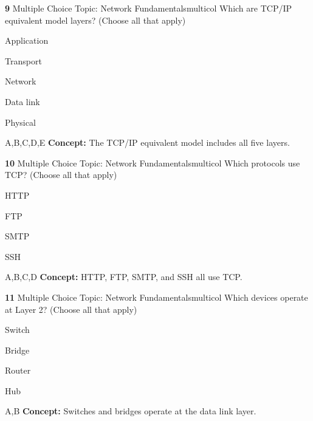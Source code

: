 \documentclass[10pt,a4paper]{article}
\begin{document}
\begin{qcard}{\color{white}\textbf{9} \hfill \small Multiple Choice \textbar{} Topic: Network Fundamentals}{multicol}
Which are TCP/IP equivalent model layers? (Choose all that apply)

\begin{qoptions}
\item Application
\item Transport
\item Network
\item Data link
\item Physical
\end{qoptions}
\begin{explainbox}{A,B,C,D,E}
\textbf{Concept:} The TCP/IP equivalent model includes all five layers.
\end{explainbox}
\end{qcard}

\begin{qcard}{\color{white}\textbf{10} \hfill \small Multiple Choice \textbar{} Topic: Network Fundamentals}{multicol}
Which protocols use TCP? (Choose all that apply)

\begin{qoptions}
\item HTTP
\item FTP
\item SMTP
\item SSH
\end{qoptions}
\begin{explainbox}{A,B,C,D}
\textbf{Concept:} HTTP, FTP, SMTP, and SSH all use TCP.
\end{explainbox}
\end{qcard}

\begin{qcard}{\color{white}\textbf{11} \hfill \small Multiple Choice \textbar{} Topic: Network Fundamentals}{multicol}
Which devices operate at Layer 2? (Choose all that apply)

\begin{qoptions}
\item Switch
\item Bridge
\item Router
\item Hub
\end{qoptions}
\begin{explainbox}{A,B}
\textbf{Concept:} Switches and bridges operate at the data link layer.
\end{explainbox}
\end{qcard}
\end{document}

